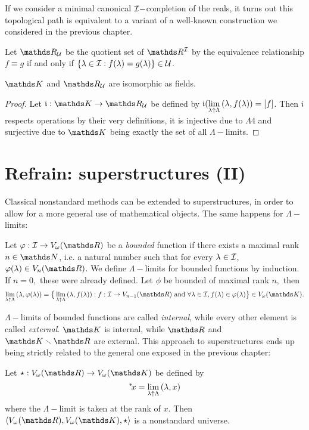 \documentclass[draft.tex]{subfiles}
\begin{document}
\par If we consider a minimal canonical $\mathcal{I}-$completion of the reals, it turns out this topological path is equivalent to a variant of a well-known construction we considered in the previous chapter.
\begin{definition}
Let $\RR_{\cl{U}}$ be the quotient set of $\RR^{\cl{I}}$ by the equivalence relationship $f \equiv g$ if and only if $\{\lambda \in \mathcal{I}: f(\lambda) = g(\lambda)\} \in \mathcal{U}$.
\end{definition}
\begin{theorem}
$\struct{K}$ and $\RR_{\cl{U}}$ are isomorphic as fields.
\end{theorem}
\begin{proof}
Let $\mathfrak{i}: \struct{K} \to \RR_{\cl{U}}$ be defined by $   \mathfrak{i}(\lim\limits_{\lambda \uparrow \Lambda}{(\lambda, f(\lambda))} = [f]$. Then $\mathfrak{i}$ respects operations by their very definitions, it is injective due to $\Lambda4$ and surjective due to $\struct{K}$ being exactly the set of all $\Lambda-$limits.
\end{proof}
\section{Refrain: superstructures (II)}
Classical nonstandard methods can be extended to superstructures, in order to allow for a more general use of mathematical objects. The same happens for $\Lambda-$limits:
\begin{definition}
Let $\phi: \cl{I} \to V_{\omega}(\RR)$ be a \emph{bounded} function if there exists a maximal rank $n \in \NN$, i.e. a natural number such that for every $\lambda \in \mathcal{I}$, $\phi(\lambda) \in V_{n}(\RR)$. We define $\Lambda-$limits for bounded functions by induction. If $n = 0,$ these were already defined. Let $\phi$ be bounded of maximal rank $n,$ then
\begin{equation*}
    \lambdalim{(\lambda, \phi(\lambda))} = \big\{\lambdalim{(\lambda, f(\lambda))}: f: \cl{I} \to V_{n-1}(\RR) \ \mathrm{and} \ \forall \lambda \in \cl{I}, f(\lambda) \in \phi(\lambda)\big\} \in V_{\omega}(\struct{K}).
\end{equation*}
\end{definition}
$\Lambda-$limits of bounded functions are called \emph{internal}, while every other element is called \emph{external}. $\struct{K}$ is internal, while $\RR$ and $\struct{K} \sm \RR$ are external. This approach to superstructures ends up being strictly related to the general one exposed in the previous chapter:
\begin{theorem}
Let $\star: V_{\omega}(\RR) \to V_{\omega}(\struct{K})$ be defined by
\begin{equation*}
    {{}^{*}\!{x}} = \lim\limits_{\lambda \uparrow \Lambda}{(\lambda, x)}
\end{equation*}
where the $\Lambda-$limit is taken at the rank of $x$. Then $\langle V_{\omega}(\RR), V_{\omega}(\struct{K}), \star \rangle$ is a nonstandard universe.
\end{theorem}
\end{document}
